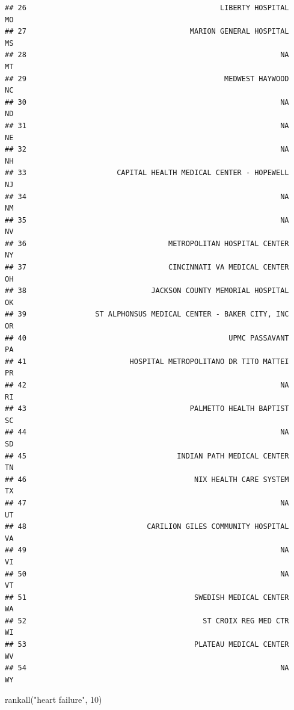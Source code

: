 \documentclass[
]{book}
\newenvironment{Shaded}{\begin{snugshade}}{\end{snugshade}}
\newcommand{\DecValTok}[1]{\textcolor[rgb]{0.00,0.00,0.81}{#1}}
\newcommand{\FunctionTok}[1]{\textcolor[rgb]{0.00,0.00,0.00}{#1}}
\newcommand{\NormalTok}[1]{#1}
\newcommand{\StringTok}[1]{\textcolor[rgb]{0.31,0.60,0.02}{#1}}
\theoremstyle{definition}
\theoremstyle{definition}
\theoremstyle{definition}
\theoremstyle{definition}
\theoremstyle{remark}
\begin{document}
\begin{verbatim}
## 26                                             LIBERTY HOSPITAL    MO
## 27                                      MARION GENERAL HOSPITAL    MS
## 28                                                           NA    MT
## 29                                              MEDWEST HAYWOOD    NC
## 30                                                           NA    ND
## 31                                                           NA    NE
## 32                                                           NA    NH
## 33                     CAPITAL HEALTH MEDICAL CENTER - HOPEWELL    NJ
## 34                                                           NA    NM
## 35                                                           NA    NV
## 36                                 METROPOLITAN HOSPITAL CENTER    NY
## 37                                 CINCINNATI VA MEDICAL CENTER    OH
## 38                             JACKSON COUNTY MEMORIAL HOSPITAL    OK
## 39                ST ALPHONSUS MEDICAL CENTER - BAKER CITY, INC    OR
## 40                                               UPMC PASSAVANT    PA
## 41                        HOSPITAL METROPOLITANO DR TITO MATTEI    PR
## 42                                                           NA    RI
## 43                                      PALMETTO HEALTH BAPTIST    SC
## 44                                                           NA    SD
## 45                                   INDIAN PATH MEDICAL CENTER    TN
## 46                                       NIX HEALTH CARE SYSTEM    TX
## 47                                                           NA    UT
## 48                            CARILION GILES COMMUNITY HOSPITAL    VA
## 49                                                           NA    VI
## 50                                                           NA    VT
## 51                                       SWEDISH MEDICAL CENTER    WA
## 52                                         ST CROIX REG MED CTR    WI
## 53                                       PLATEAU MEDICAL CENTER    WV
## 54                                                           NA    WY
\end{verbatim}

\begin{Shaded}
\begin{Highlighting}[]
\FunctionTok{rankall}\NormalTok{(}\StringTok{"heart failure"}\NormalTok{, }\DecValTok{10}\NormalTok{)}
\end{Highlighting}
\end{Shaded}
\end{document}
